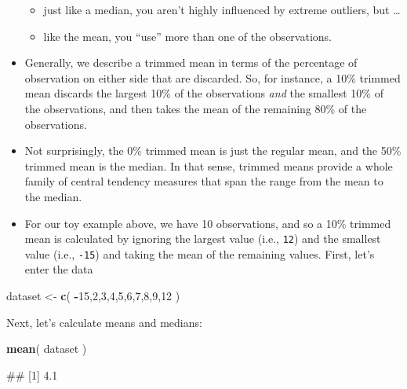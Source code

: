 \documentclass[
]{book}
\newenvironment{Shaded}{\begin{snugshade}}{\end{snugshade}}
\newcommand{\DecValTok}[1]{\textcolor[rgb]{0.00,0.00,0.81}{#1}}
\newcommand{\FunctionTok}[1]{\textcolor[rgb]{0.13,0.29,0.53}{\textbf{#1}}}
\newcommand{\NormalTok}[1]{#1}
\newcommand{\OtherTok}[1]{\textcolor[rgb]{0.56,0.35,0.01}{#1}}
\newcommand{\SpecialCharTok}[1]{\textcolor[rgb]{0.81,0.36,0.00}{\textbf{#1}}}
\providecommand{\tightlist}{%
  \setlength{\itemsep}{0pt}\setlength{\parskip}{0pt}}
\begin{document}
\begin{itemize}
  \begin{itemize}
  \tightlist
  \item
    just like a median, you aren't highly influenced by extreme outliers, but \ldots{}
  \item
    like the mean, you ``use'' more than one of the observations.
  \end{itemize}
\item
  Generally, we describe a trimmed mean in terms of the percentage of observation on either side that are discarded. So, for instance, a 10\% trimmed mean discards the largest 10\% of the observations \emph{and} the smallest 10\% of the observations, and then takes the mean of the remaining 80\% of the observations.
\item
  Not surprisingly, the 0\% trimmed mean is just the regular mean, and the 50\% trimmed mean is the median. In that sense, trimmed means provide a whole family of central tendency measures that span the range from the mean to the median.
\item
  For our toy example above, we have 10 observations, and so a 10\% trimmed mean is calculated by ignoring the largest value (i.e., \texttt{12}) and the smallest value (i.e., \texttt{-15}) and taking the mean of the remaining values. First, let's enter the data
\end{itemize}

\begin{Shaded}
\begin{Highlighting}[]
\NormalTok{dataset }\OtherTok{\textless{}{-}} \FunctionTok{c}\NormalTok{( }\SpecialCharTok{{-}}\DecValTok{15}\NormalTok{,}\DecValTok{2}\NormalTok{,}\DecValTok{3}\NormalTok{,}\DecValTok{4}\NormalTok{,}\DecValTok{5}\NormalTok{,}\DecValTok{6}\NormalTok{,}\DecValTok{7}\NormalTok{,}\DecValTok{8}\NormalTok{,}\DecValTok{9}\NormalTok{,}\DecValTok{12}\NormalTok{ )}
\end{Highlighting}
\end{Shaded}

Next, let's calculate means and medians:

\begin{Shaded}
\begin{Highlighting}[]
\FunctionTok{mean}\NormalTok{( dataset )}
\end{Highlighting}
\end{Shaded}

\begin{Shaded}
\begin{Highlighting}[]
\NormalTok{\#\# [1] 4.1}
\end{Highlighting}
\end{Shaded}
\end{document}
